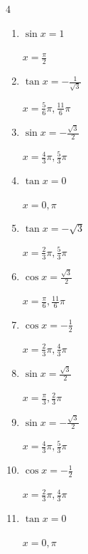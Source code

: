 \begin{multicols}{4}
\begin{enumerate}
        $\displaystyle x = \frac{\pi}{2} , \frac{3}{2}\pi$

\columnbreak %

  \item $\displaystyle \sin{x}  = 1$

        $\displaystyle x = \frac{\pi}{2}$

  \item $\displaystyle \tan{x}  = -\frac{1}{\sqrt{3}}$

        $\displaystyle x = \frac{5}{6}\pi , \frac{11}{6}\pi$

  \item $\displaystyle \sin{x}  = -\frac{\sqrt{3}}{2}$

        $\displaystyle x = \frac{4}{3}\pi , \frac{5}{3}\pi$

  \item $\displaystyle \tan{x}  = 0$

        $\displaystyle x = 0 , \pi$

  \item $\displaystyle \tan{x}  = -\sqrt{3}$

        $\displaystyle x = \frac{2}{3}\pi , \frac{5}{3}\pi$

  \item $\displaystyle \cos{x}  = \frac{\sqrt{3}}{2}$

        $\displaystyle x = \frac{\pi}{6} , \frac{11}{6}\pi$

  \item $\displaystyle \cos{x}  = -\frac{1}{2}$

        $\displaystyle x = \frac{2}{3}\pi , \frac{4}{3}\pi$

  \item $\displaystyle \sin{x}  = \frac{\sqrt{3}}{2}$

        $\displaystyle x = \frac{\pi}{3} , \frac{2}{3}\pi$

  \item $\displaystyle \sin{x}  = -\frac{\sqrt{3}}{2}$

        $\displaystyle x = \frac{4}{3}\pi , \frac{5}{3}\pi$

  \item $\displaystyle \cos{x}  = -\frac{1}{2}$

        $\displaystyle x = \frac{2}{3}\pi , \frac{4}{3}\pi$

  \item $\displaystyle \tan{x}  = 0$

        $\displaystyle x = 0 , \pi$


\end{enumerate}
\end{multicols}
